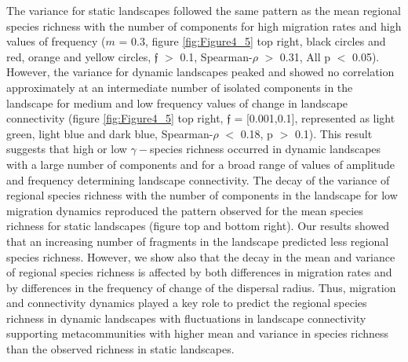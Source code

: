 \documentclass[a4paper,12pt]{article}
\begin{document}
The variance for static landscapes followed the same pattern as the mean regional species richness with the number of components for high migration rates and high values of frequency ($m$ = 0.3, figure \ref{fig:Figure4_5} top right, black circles and red, orange and yellow circles, $\mathfrak{f}$ $>$ 0.1, Spearman-$\rho$ $>$ 0.31, All p $<$ 0.05). However, the variance for dynamic landscapes peaked and showed no correlation approximately at an intermediate number of isolated components in the landscape for medium and low frequency values of change in landscape connectivity (figure \ref{fig:Figure4_5} top right, $\mathfrak{f}$ = [0.001,0.1], represented as light green, light blue and dark blue, Spearman-$\rho$ $<$ 0.18, p $>$ 0.1). This result suggests that high or low $\gamma-$species richness occurred in dynamic landscapes with a large number of components and for a broad range of values of amplitude and frequency determining landscape connectivity. The decay of the variance of regional species richness with the number of components in the landscape for low migration dynamics reproduced the pattern observed for the mean species richness for static landscapes (figure  top and bottom right). Our results showed that an increasing number of fragments in the landscape predicted less regional species richness. However, we show also that the decay in the mean and variance of regional species richness is affected by both differences in migration rates and by differences in the frequency of change of the dispersal radius. Thus, migration and connectivity dynamics played a key role to predict the regional species richness in dynamic landscapes with fluctuations in landscape connectivity supporting metacommunities with higher mean and variance in species richness than the observed richness in static landscapes. 
\end{document}
